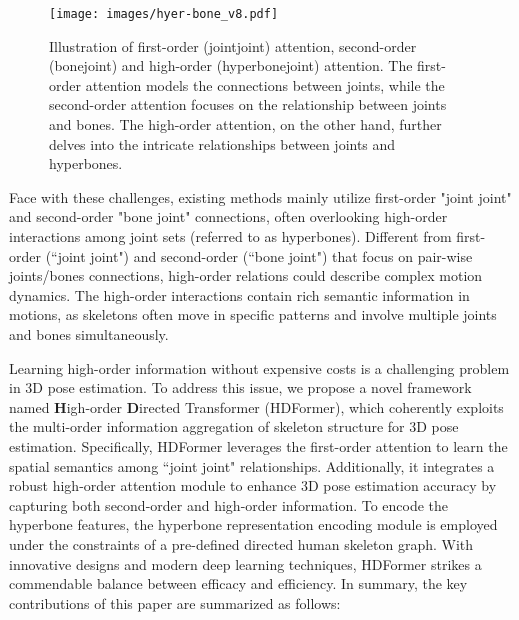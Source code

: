 \documentclass{article}
\begin{document}
\begin{figure}[!t]
    \centering
    \centerline{\texttt{[image: images/hyer-bone\_v8.pdf]}}
    \vspace{-2mm}
    \caption{\small Illustration of first-order (jointjoint) attention, second-order (bonejoint) and high-order (hyperbonejoint) attention. The first-order attention models the connections between joints, while the second-order attention focuses on the relationship between joints and bones. The high-order attention, on the other hand, further delves into the intricate relationships between joints and hyperbones.}
    \vspace{-4mm}
    \label{fig:fron_image}
\end{figure}

Face with these challenges, existing methods mainly utilize first-order "joint  joint" and second-order "bone  joint" connections, often overlooking high-order interactions among joint sets (referred to as hyperbones).
Different from first-order (``joint  joint") and second-order (``bone  joint") that focus on pair-wise joints/bones connections, high-order relations could describe complex motion dynamics. The high-order interactions contain rich semantic information in motions, as skeletons often move in specific patterns and involve multiple joints and bones simultaneously. 

Learning high-order information without expensive costs is a challenging problem in 3D pose estimation. To address this issue, we propose a novel framework named \textbf{H}igh-order \textbf{D}irected Transformer (HDFormer), which coherently exploits the multi-order information aggregation of skeleton structure for 3D pose estimation.
Specifically, HDFormer leverages the first-order attention to learn the spatial semantics among ``joint  joint" relationships.
Additionally, it integrates a robust high-order attention module to enhance 3D pose estimation accuracy by capturing both second-order and high-order information.
To encode the hyperbone features, the hyperbone representation encoding module is employed under the constraints of a pre-defined directed human skeleton graph. 
With innovative designs and modern deep learning techniques, HDFormer strikes a commendable balance between efficacy and efficiency. 
In summary, the key contributions of this paper are summarized as follows:
\end{document}

